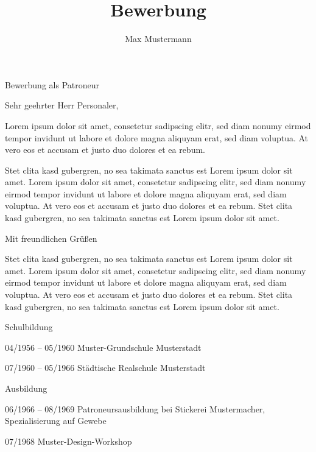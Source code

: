 \documentclass[german]{alpication}
\author{Max Mustermann}
\title{Bewerbung}
\begin{document}
% 
% 
\begin{correspondence}{Bewerbung als Patroneur}		%
	\opening{Sehr geehrter Herr Personaler,}	%

	Lorem ipsum dolor sit amet, consetetur sadipscing elitr, sed diam nonumy eirmod tempor invidunt ut labore
	et dolore magna aliquyam erat, sed diam voluptua. At vero eos et accusam et justo duo dolores et ea rebum.
	
	Stet clita kasd gubergren, no sea takimata sanctus est Lorem ipsum dolor sit amet. Lorem ipsum dolor sit amet,
	consetetur sadipscing elitr, sed diam nonumy eirmod tempor invidunt ut labore et dolore magna aliquyam erat,
	sed diam voluptua. At vero eos et accusam et justo duo dolores et ea rebum. Stet clita kasd gubergren, no sea
	takimata sanctus est Lorem ipsum dolor sit amet.

	\closing{Mit freundlichen Grüßen}
	
	\appendixList	%
	
\end{correspondence}

% 
%
\begin{motivation}
	Stet clita kasd gubergren, no sea takimata sanctus est Lorem ipsum dolor sit amet. Lorem ipsum dolor sit amet,
	consetetur sadipscing elitr, sed diam nonumy eirmod tempor invidunt ut labore et dolore magna aliquyam erat,
	sed diam voluptua. At vero eos et accusam et justo duo dolores et ea rebum. Stet clita kasd gubergren, no sea
	takimata sanctus est Lorem ipsum dolor sit amet.
\end{motivation}


% 
% 
\begin{curriculumvitae}
	\begin{cvsection}{Schulbildung}
		\item [04/1956 -- 05/1960] 	Muster-Grundschule Musterstadt
		\item [07/1960 -- 05/1966] 	Städtische Realschule Musterstadt
	\end{cvsection}

	\begin{cvsection}{Ausbildung}
		\item [06/1966 -- 08/1969] 	Patroneursausbildung bei Stickerei Mustermacher,\\Spezialisierung auf Gewebe
		\item [07/1968]			Muster-Design-Workshop
	\end{cvsection}
\end{curriculumvitae}

% 
% 
\end{document}
